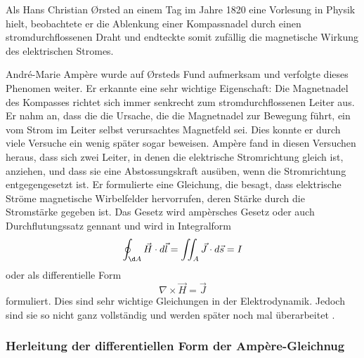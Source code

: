 Als Hans Christian Ørsted an einem Tag im Jahre 1820 eine Vorlesung in Physik hielt, beobachtete er die Ablenkung einer Kompassnadel durch einen stromdurchflossenen Draht und endteckte somit zufällig die magnetische Wirkung des elektrischen Stromes.

André-Marie Ampère wurde auf Ørsteds Fund aufmerksam und verfolgte dieses Phenomen weiter.
Er erkannte eine sehr wichtige Eigenschaft: Die Magnetnadel des Kompasses richtet sich immer senkrecht zum stromdurchflossenen Leiter aus.
Er nahm an, dass die die Ursache, die die Magnetnadel zur Bewegung führt, ein vom Strom im Leiter selbst verursachtes Magnetfeld sei.
Dies konnte er durch viele Versuche ein wenig später sogar beweisen.
Ampère fand in diesen Versuchen heraus, dass sich zwei Leiter, in denen die elektrische Stromrichtung gleich ist, anziehen, und dass sie eine Abstossungskraft ausüben, wenn die Stromrichtung entgegengesetzt ist.
Er formulierte eine Gleichung, die besagt, dass elektrische Ströme magnetische Wirbelfelder hervorrufen, deren Stärke durch die Stromstärke gegeben ist.
Das Gesetz wird ampèrsches Gesetz oder auch Durchflutungssatz gennant und wird in Integralform
\[
\oint_{\d A}
\vec{H}
\cdot
d\vec{l}
=
\iint_{A}
\vec{J}
\cdot
d\vec{s}
=
I
\]
oder als differentielle Form
\[
\nabla
\times
\vec{H}
=
\vec{J}
\]
formuliert.
Dies sind sehr wichtige Gleichungen in der Elektrodynamik.
Jedoch sind sie so nicht ganz vollständig und werden später noch mal überarbeitet \cite{maxwell:Hans_Christian_Ørsted}\cite{maxwell:André-Marie_Ampère}.

\subsubsection{Herleitung der differentiellen Form der Ampère-Gleichnug}

